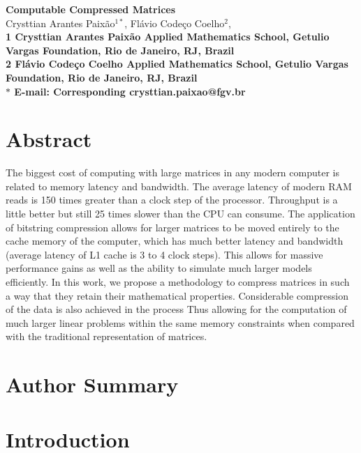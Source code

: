 \documentclass[10pt]{article}
\date{}
\begin{document}
\begin{flushleft}
{\Large
\textbf{Computable Compressed Matrices}
}
\\
Crysttian Arantes Paix\~{a}o$^{1\ast}$, 
Fl\'{a}vio Code\c{c}o Coelho$^{2}$, 
\\
\bf{1} Crysttian Arantes Paix\~{a}o Applied Mathematics School, Getulio Vargas Foundation, Rio de Janeiro, RJ, Brazil
\\
\bf{2} Fl\'{a}vio Code\c{c}o Coelho Applied Mathematics School, Getulio Vargas Foundation, Rio de Janeiro, RJ, Brazil
\\
$\ast$ E-mail: Corresponding crysttian.paixao@fgv.br
\end{flushleft}

\section*{Abstract}
The biggest cost of
computing with large matrices in any modern computer is related to memory
latency and bandwidth. The average latency of modern RAM reads is 150 times
greater than a clock step of the processor\cite{alted2010modern}. Throughput is
a little better but still 25 times slower than the CPU can consume. The
application of bitstring compression allows for larger matrices to be moved
entirely to the cache memory of the computer, which has much better latency and
bandwidth (average latency of L1 cache is 3 to 4 clock steps). This allows for
massive performance gains as well as the ability to simulate much larger models
efficiently. In this work, we propose a methodology to compress matrices in such
a way that they retain their mathematical properties. Considerable compression
of the data is also achieved in the process Thus allowing for the computation of
much larger linear problems within the same memory constraints when compared
with the traditional representation of matrices.
\section*{Author Summary}

\section*{Introduction}
\end{document}
